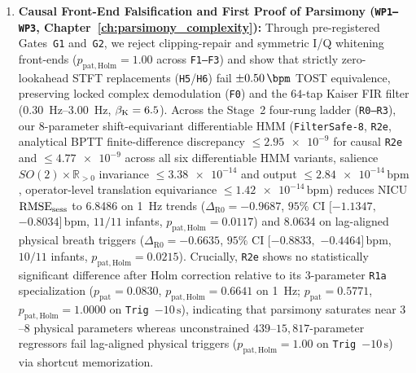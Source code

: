 \begin{enumerate}
  \item \textbf{Causal Front-End Falsification and First Proof of Parsimony (\texttt{WP1--WP3}, Chapter~\ref{ch:parsimony_complexity}):}
    Through pre-registered Gates~\texttt{G1} and~\texttt{G2}, we reject clipping-repair and symmetric I/Q
    whitening front-ends ($p_{\mathrm{pat,Holm}} = 1.00$ across \texttt{F1--F3}) and show that strictly
    zero-lookahead STFT replacements (\texttt{H5}/\texttt{H6}) fail $\pm\SI{0.50}{\bpm}$ TOST
    equivalence, preserving locked complex demodulation (\texttt{F0}) and the $64$-tap Kaiser FIR
    filter (\SIrange{0.30}{3.00}{\hertz}, $\beta_{\mathrm{K}}=6.5$). Across the Stage~2 four-rung ladder
    (\texttt{R0--R3}), our $8$-parameter shift-equivariant differentiable HMM
    (\texttt{FilterSafe-8}, \texttt{R2e}, analytical BPTT finite-difference discrepancy
    $\le\num{2.95e-9}$ for causal \texttt{R2e} and $\le\num{4.77e-9}$ across all six differentiable
    HMM variants, salience $SO(2)\times\mathbb{R}_{>0}$ invariance $\le\num{3.38e-14}$ and output
    $\le\num{2.84e-14}\,\mathrm{bpm}$, operator-level translation equivariance
    $\le\num{1.42e-14}\,\mathrm{bpm}$) reduces NICU $\mathrm{RMSE}_{\mathrm{sess}}$ to \SI{6.8486}{\bpm} on \SI{1}{\hertz}
    trends ($\Delta_{\mathrm{R0}} = -0.9687$, $95\%$ CI $[-1.1347,$ $-0.8034]\,\mathrm{bpm}$, $11/11$ infants,
    $p_{\mathrm{pat,Holm}} = 0.0117$) and \SI{8.0634}{\bpm} on lag-aligned physical breath triggers
    ($\Delta_{\mathrm{R0}} = -0.6635$, $95\%$ CI $[-0.8833,$ $-0.4464]\,\mathrm{bpm}$, $10/11$ infants,
    $p_{\mathrm{pat,Holm}} = 0.0215$). Crucially, \texttt{R2e} shows no statistically significant
    difference after Holm correction relative to its $3$-parameter \texttt{R1a} specialization
    ($p_{\mathrm{pat}} = 0.0830$, $p_{\mathrm{pat,Holm}} = 0.6641$ on \SI{1}{\hertz};
    $p_{\mathrm{pat}} = 0.5771$, $p_{\mathrm{pat,Holm}} = 1.0000$ on \texttt{Trig~$-10\,\mathrm{s}$}),
    indicating that parsimony saturates near $3$--$8$ physical parameters whereas unconstrained
    $439$--$15{,}817$-parameter regressors fail lag-aligned physical triggers
    ($p_{\mathrm{pat,Holm}} = 1.00$ on \texttt{Trig~$-10\,\mathrm{s}$}) via shortcut memorization.


\end{enumerate}
